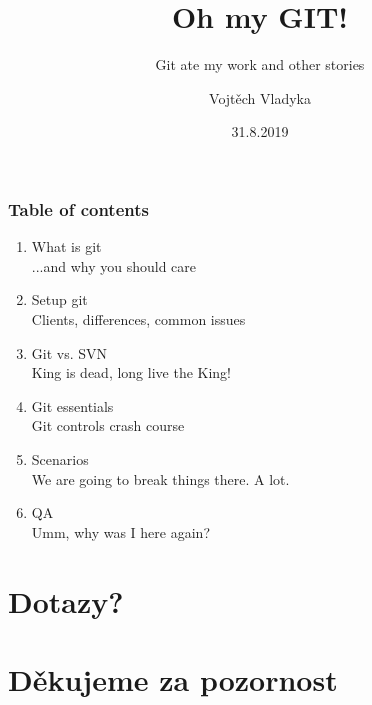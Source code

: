 \documentclass{beamer}
\title{Oh my GIT!}
\subtitle{Git ate my work and other stories}
\author{Vojtěch Vladyka}
\date{31.8.2019}
\begin{document}
    \frame{\titlepage}
	   \begin{frame}
           \frametitle{Table of contents}
           \begin{enumerate}
               \item What is git
               \\   \textcolor{solarizedRebase01}{\footnotesize\hspace{1em} ...and why you should care}	
               \item Setup git
               \\   \textcolor{solarizedRebase01}{\footnotesize\hspace{1em} Clients, differences, common issues}	
               \item Git vs. SVN
               \\   \textcolor{solarizedRebase01}{\footnotesize\hspace{1em} King is dead, long live the King!}	
               \item Git essentials
               \\   \textcolor{solarizedRebase01}{\footnotesize\hspace{1em} Git controls crash course}	
               \item Scenarios
               \\   \textcolor{solarizedRebase01}{\footnotesize\hspace{1em} We are going to break things there. A lot.}	
               \item QA
               \\   \textcolor{solarizedRebase01}{\footnotesize\hspace{1em} Umm, why was I here again?}
           \end{enumerate}
       \end{frame}
       \begin{frame}
       \end{frame}
       \section{Dotazy?}
       \section{Děkujeme za pozornost}
\end{document}
